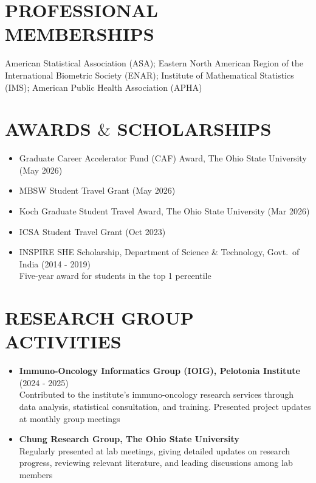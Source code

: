 \documentclass[11pt,a4paper,roman]{moderncv}        %
\begin{document}
\section{PROFESSIONAL MEMBERSHIPS}
American Statistical Association (ASA); Eastern North American Region of the International Biometric Society (ENAR); Institute of Mathematical Statistics (IMS); American Public Health Association (APHA)

\section{AWARDS $\&$ SCHOLARSHIPS}
\begin{itemize}
\vskip 0.1cm
    \item Graduate Career Accelerator Fund (CAF) Award, The Ohio State University (May 2026)
\vskip 0.1cm
    \item MBSW Student Travel Grant (May 2026)
\vskip 0.1cm
    \item Koch Graduate Student Travel Award, The Ohio State University (Mar 2026)
\vskip 0.1cm
    \item ICSA Student Travel Grant (Oct 2023)
\vskip 0.1cm
    \item INSPIRE SHE Scholarship, Department of Science \& Technology, Govt.\ of India (2014 - 2019) \\
    Five-year award for students in the top 1 percentile
 \end{itemize}

\section{RESEARCH GROUP ACTIVITIES}
\begin{itemize}
\vskip 0.1cm
\item \textbf{Immuno-Oncology Informatics Group (IOIG), Pelotonia Institute} (2024 - 2025)\\
Contributed to the institute's immuno-oncology research services through data analysis, statistical consultation, and training. Presented project updates at monthly group meetings
\vskip 0.1cm
\item \textbf{Chung Research Group, The Ohio State University}\\
Regularly presented at lab meetings, giving detailed updates on research progress, reviewing relevant literature, and leading discussions among lab members
\end{itemize}
\end{document}
